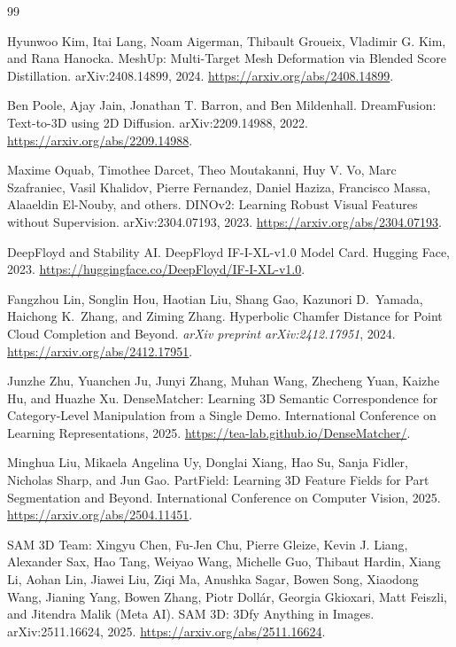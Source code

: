 \documentclass{article}
\begin{document}
\begingroup
\setlength{\itemsep}{0pt}
\setlength{\parsep}{0pt}
\setlength{\parskip}{0.3em}
\begin{thebibliography}{99}

Hyunwoo Kim, Itai Lang, Noam Aigerman, Thibault Groueix, Vladimir G. Kim,
and Rana Hanocka.
\newblock MeshUp: Multi-Target Mesh Deformation via Blended Score Distillation.
\newblock arXiv:2408.14899, 2024.
\newblock \url{https://arxiv.org/abs/2408.14899}.

Ben Poole, Ajay Jain, Jonathan T. Barron, and Ben Mildenhall.
\newblock DreamFusion: Text-to-3D using 2D Diffusion.
\newblock arXiv:2209.14988, 2022.
\newblock \url{https://arxiv.org/abs/2209.14988}.

Maxime Oquab, Timothee Darcet, Theo Moutakanni, Huy V. Vo, Marc Szafraniec,
Vasil Khalidov, Pierre Fernandez, Daniel Haziza, Francisco Massa, Alaaeldin
El-Nouby, and others.
\newblock DINOv2: Learning Robust Visual Features without Supervision.
\newblock arXiv:2304.07193, 2023.
\newblock \url{https://arxiv.org/abs/2304.07193}.

DeepFloyd and Stability AI.
\newblock DeepFloyd IF-I-XL-v1.0 Model Card.
\newblock Hugging Face, 2023.
\newblock \url{https://huggingface.co/DeepFloyd/IF-I-XL-v1.0}.

Fangzhou Lin, Songlin Hou, Haotian Liu, Shang Gao, Kazunori D.~Yamada,
Haichong K.~Zhang, and Ziming Zhang.
\newblock Hyperbolic Chamfer Distance for Point Cloud Completion and Beyond.
\newblock \textit{arXiv preprint arXiv:2412.17951}, 2024.
\newblock \url{https://arxiv.org/abs/2412.17951}.

Junzhe Zhu, Yuanchen Ju, Junyi Zhang, Muhan Wang, Zhecheng Yuan, Kaizhe Hu,
and Huazhe Xu.
\newblock DenseMatcher: Learning 3D Semantic Correspondence for Category-Level
Manipulation from a Single Demo.
\newblock International Conference on Learning Representations, 2025.
\newblock \url{https://tea-lab.github.io/DenseMatcher/}.

Minghua Liu, Mikaela Angelina Uy, Donglai Xiang, Hao Su, Sanja Fidler,
Nicholas Sharp, and Jun Gao.
\newblock PartField: Learning 3D Feature Fields for Part Segmentation and
Beyond.
\newblock International Conference on Computer Vision, 2025.
\newblock \url{https://arxiv.org/abs/2504.11451}.

SAM 3D Team: Xingyu Chen, Fu-Jen Chu, Pierre Gleize, Kevin J. Liang, Alexander Sax, Hao Tang,
Weiyao Wang, Michelle Guo, Thibaut Hardin, Xiang Li, Aohan Lin, Jiawei Liu, Ziqi Ma, Anushka
Sagar, Bowen Song, Xiaodong Wang, Jianing Yang, Bowen Zhang, Piotr Doll\'ar, Georgia Gkioxari,
Matt Feiszli, and Jitendra Malik (Meta AI).
\newblock SAM 3D: 3Dfy Anything in Images.
\newblock arXiv:2511.16624, 2025.
\newblock \url{https://arxiv.org/abs/2511.16624}.


\end{thebibliography}
\end{document}
